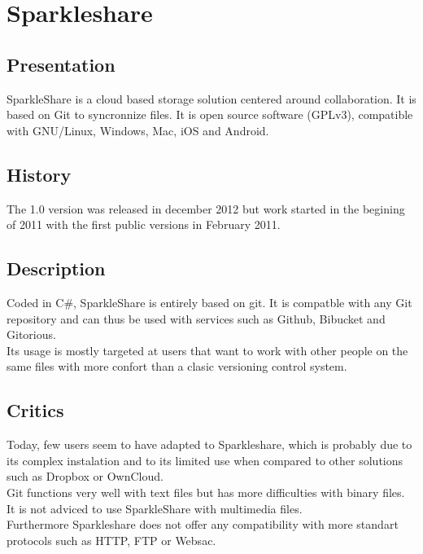 \section{Sparkleshare}
\thispagestyle{EIP} %
\subsection{Presentation}
SparkleShare is a cloud based storage solution centered around collaboration. It is based on Git to syncronnize files. It is open source software (GPLv3), compatible with GNU/Linux, Windows, Mac, iOS and Android.\\

\subsection{History}
The 1.0 version was released in december 2012 but work started in the begining of 2011 with the first public versions in February 2011.\\

\subsection{Description}
Coded in C\#, SparkleShare is entirely based on git. It is compatble with any Git repository and can thus be used with services such as Github, Bibucket and Gitorious.\\
Its usage is mostly targeted at users that want to work with other people on the same files with more confort than a clasic versioning control system.\\

\subsection{Critics}
Today, few users seem to have adapted to Sparkleshare, which is probably due to its complex instalation and to its limited use when compared to other solutions such as Dropbox or OwnCloud.\\

Git functions very well with text files but has more difficulties with binary files. It is not adviced to use SparkleShare with multimedia files.\\
Furthermore Sparkleshare does not offer any compatibility with more standart protocols such as HTTP, FTP or Websac.\\
